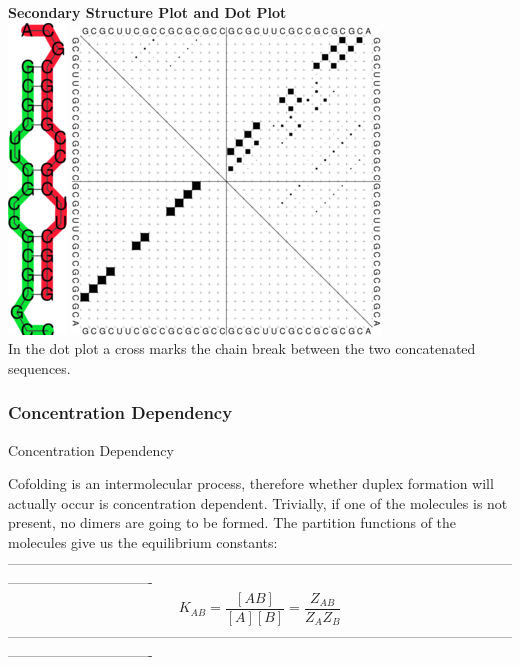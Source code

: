 \documentclass[]{article}
\begin{document}
\textbf{Secondary Structure Plot and Dot Plot}\\
 \includegraphics{Figs/t_ss.png}
\includegraphics{Figs/t_dp.png}\\
In the dot plot a cross marks the chain break between the two
concatenated sequences.

\subsubsection{Concentration Dependency}{Concentration Dependency}\label{concentration-dependency}

Cofolding is an intermolecular process, therefore whether duplex
formation will actually occur is concentration dependent. Trivially, if
one of the molecules is not present, no dimers are going to be formed.
The partition functions of the molecules give us the equilibrium
constants:
-------------------------------------------------------------------------------------------------------------------------------------------
\[K_{AB} = \frac{\left\lbrack {AB} \right\rbrack}{\left\lbrack A \right\rbrack\left\lbrack B \right\rbrack} = \frac{Z_{AB}}{Z_{A}Z_{B}}\]
-------------------------------------------------------------------------------------------------------------------------------------------
\end{document}
